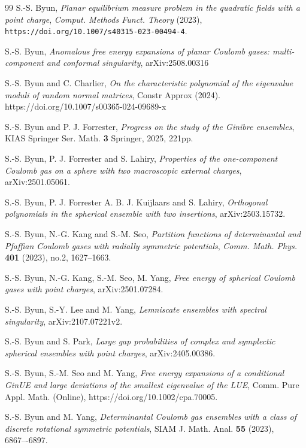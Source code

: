 \documentclass[reqno]{amsart}
\newcommand{\1}{\mathds{1}}
\numberwithin{equation}{section}
\theoremstyle{definition}
\begin{document}
\begin{thebibliography}{99}
 S.-S. Byun, \emph{Planar equilibrium measure problem in the quadratic fields with a point charge}, \textit{Comput. Methods Funct. Theory} (2023), \texttt{https://doi.org/10.1007/s40315-023-00494-4}.


 S.-S. Byun, \emph{Anomalous free energy expansions of planar Coulomb gases: multi-component and conformal singularity}, arXiv:2508.00316



 S.-S. Byun and C. Charlier, \emph{On the characteristic polynomial of the eigenvalue moduli of random normal matrices}, Constr Approx (2024). https://doi.org/10.1007/s00365-024-09689-x

 S.-S. Byun and P. J. Forrester, \emph{Progress on the study of the Ginibre ensembles}, KIAS Springer Ser. Math. \textbf{3} Springer, 2025, 221pp.


S.-S. Byun, P. J. Forrester and S. Lahiry, \emph{Properties of the one-component Coulomb gas on a sphere with two macroscopic external charges}, arXiv:2501.05061.



S.-S. Byun, P. J. Forrester A. B. J. Kuijlaars and S. Lahiry, \emph{Orthogonal polynomials in the spherical ensemble with two insertions}, arXiv:2503.15732.

 S.-S. Byun, N.-G. Kang and S.-M. Seo, \emph{Partition functions of determinantal and Pfaffian Coulomb gases with radially symmetric potentials}, \textit{Comm. Math. Phys.} \textbf{401} (2023), no.2, 1627--1663.



S.-S. Byun, N.-G. Kang, S.-M. Seo, M. Yang, \emph{Free energy of spherical Coulomb gases with point charges}, arXiv:2501.07284.

S.-S. Byun, S.-Y. Lee and M. Yang, \emph{Lemniscate ensembles with spectral singularity}, arXiv:2107.07221v2.

 S.-S. Byun and S. Park, \emph{Large gap probabilities of complex and symplectic spherical ensembles with point charges}, arXiv:2405.00386.

S.-S. Byun, S.-M. Seo and M. Yang, \emph{Free energy expansions of a conditional GinUE and large deviations of the smallest eigenvalue of the LUE}, Comm. Pure Appl. Math. (Online), https://doi.org/10.1002/cpa.70005.


S.-S. Byun and M. Yang, \emph{Determinantal Coulomb gas ensembles with a class of discrete rotational symmetric potentials}, SIAM J. Math. Anal. \textbf{55} (2023), 6867–-6897.


\end{thebibliography}
\end{document}

